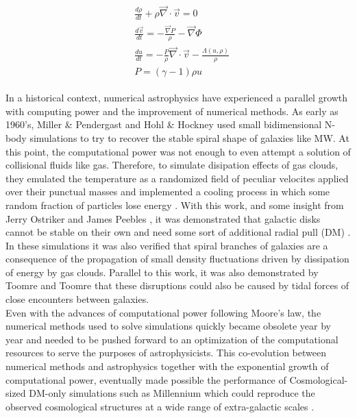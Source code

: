 \begin{align}
\begin{aligned}
&\frac{d\rho}{dt} + \rho \vec{\nabla}\cdot\vec{v} = 0\\
&\frac{d\vec{v}}{dt} = -\frac{\vec{\nabla}P}{\rho} - \vec{\nabla} \Phi \\
&\frac{du}{dt} = -\frac{P}{\rho}\vec{\nabla}\cdot\vec{v} - \frac{{\Lambda(u,\rho)}}{\rho}\\
& P = (\gamma -1 )\rho u
\end{aligned}
\label{eq:Euler}
\end{align}


In a historical context, numerical astrophysics have experienced a parallel growth with computing power and the improvement of numerical methods. 
As early as 1960's, Miller \& Pendergast \cite{Miller_and_Prendergast_1968} and Hohl \& Hockney  \cite{Hohl_and_Hockney_1969} used small bidimensional N-body simulations \cite{libro DM} to try to recover the stable spiral shape of galaxies like MW. At this point, the computational power was not enough to even attempt a solution of collisional fluids like gas. Therefore, to simulate disipation effects of gas clouds, they emulated the temperature as a randomized field of peculiar velocites applied over their punctual masses and implemented a cooling process in which some random fraction of particles lose energy \cite{Miller_et_al._1970}. With this work, and some insight from Jerry Ostriker and James Peebles \cite{Ostriker_and_Peebles_1973}, it was demonstrated that galactic disks cannot be stable on their own and need some sort of additional radial pull (DM) \cite{libro DM}. In these simulations it was also verified that spiral branches of galaxies are a consequence of the propagation of small density fluctuations driven by dissipation of energy by gas clouds. Parallel to this work, it was also demonstrated by Toomre and Toomre \cite{Toomre_and_Toomre_1972} that these disruptions could also be caused by tidal forces of close encounters between galaxies.\\

Even with the advances of computational power following Moore's law, the numerical methods used to solve simulations quickly became obsolete year by year and needed to be pushed forward to an optimization of the computational resources to serve the purposes of astrophysicists. This co-evolution between numerical methods and astrophysics together with the exponential growth of computational power, eventually made possible the performance of Cosmological-sized DM-only simulations such as Millennium which could reproduce the observed cosmological structures at a wide range of extra-galactic scales \cite{Millennium}. \\ 

